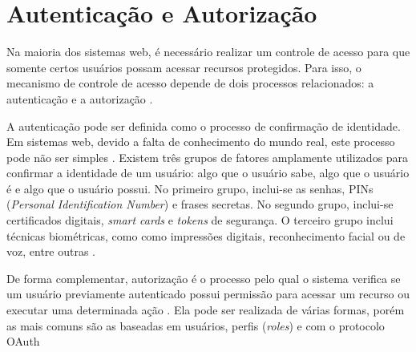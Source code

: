\section{Autenticação e Autorização}

Na maioria dos sistemas web, é necessário realizar um controle de acesso para que somente
certos usuários possam acessar recursos protegidos. Para isso, o mecanismo  de controle de
acesso depende de dois processos relacionados: a autenticação e a autorização
\cite{SULLIVAN2011}.

A autenticação pode ser definida como o processo de confirmação de identidade. Em sistemas web,
devido a falta de conhecimento do mundo real, este processo pode não ser simples
\cite{CHAPMAN2012}. Existem três grupos de fatores amplamente utilizados para confirmar a
identidade de um usuário: algo que o usuário sabe, algo que o usuário é e algo que o usuário
possui. No primeiro grupo, inclui-se as senhas, PINs (\emph{Personal Identification Number}) e
frases secretas. No segundo grupo, inclui-se certificados digitais, \emph{smart cards} e
\emph{tokens} de segurança. O terceiro grupo inclui técnicas biométricas, como como impressões
digitais, reconhecimento facial ou de voz, entre outras \cite{SULLIVAN2011}.

De forma complementar, autorização é o processo pelo qual o sistema verifica se um usuário 
previamente autenticado possui permissão para acessar um recurso ou executar uma determinada ação 
\cite{SPILCA2020}. Ela pode ser realizada de várias formas, porém as mais comuns são as baseadas em 
usuários, perfis (\emph{roles}) e com o protocolo OAuth \cite{CHAPMAN2012}
